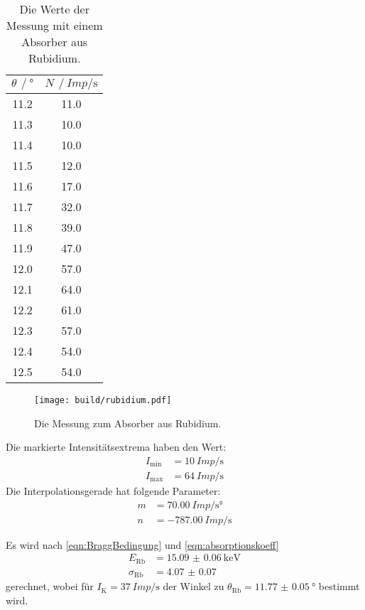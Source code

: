     \begin{table}
      \centering
      \caption{Die Werte der Messung mit einem Absorber aus Rubidium.}
      \label{tab:rubidium}
      \begin{tabular}{S[table-format=2.1] S[table-format=2.1]}
        \toprule
        $ \theta \, \mathbin{/} \si{\degree}$ & $ N \, \mathbin{/} \si{Imp\per\second}$ \\
        	&   11.0  \\
        11.3	&   10.0  \\
        11.4	&   10.0  \\
        11.5	&   12.0  \\
        11.6	&   17.0  \\
        11.7	&   32.0  \\
        11.8	&   39.0  \\
        11.9	&   47.0  \\
        12.0	&   57.0  \\
        12.1	&   64.0  \\
        12.2	&   61.0  \\
        12.3	&   57.0  \\
        12.4	&   54.0  \\
        12.5	&   54.0  \\
        \bottomrule
      \end{tabular}
    \end{table}

    \begin{figure}
      \centering
      \texttt{[image: build/rubidium.pdf]}
      \caption{Die Messung zum Absorber aus Rubidium.}
      \label{fig:rubidium}
    \end{figure}

    \noindent Die markierte Intensitätsextrema haben den Wert:
    \begin{align*}
      I_{\text{min}} &= \SI{10}{Imp\per\second}\\
      I_{\text{max}} &= \SI{64}{Imp\per\second}
    \end{align*}
    Die Interpolationsgerade hat folgende Parameter:
    \begin{align*}
      m & = \SI{70.00}{Imp\per\second\degree}\\
      n & = \SI{-787.00}{Imp\per\second}
    \end{align*}

    \noindent
    Es wird nach \eqref{eqn:BraggBedingung} und \eqref{eqn:absorptionskoeff} 
    \begin{align*}
      E_{\text{Rb}} &= \SI{15.09(6)}{\kilo\electronvolt}\\
      \sigma_{\text{Rb}} &= \num{4.07(7)}
    \end{align*} 
    gerechnet, wobei für $I_{\text{K}} = \SI{37}{Imp\per\second}$ der Winkel zu $\theta_{\text{Rb}} = \SI{11.77(5)}{\degree}$ bestimmt wird.

